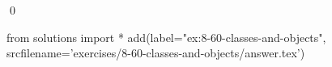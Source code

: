 
\begin{ex}
  \label{ex:8-60-classes-and-objects}
  
  \qed
\end{ex}
\begin{python0}
from solutions import *
add(label="ex:8-60-classes-and-objects",
    srcfilename='exercises/8-60-classes-and-objects/answer.tex')
\end{python0}
